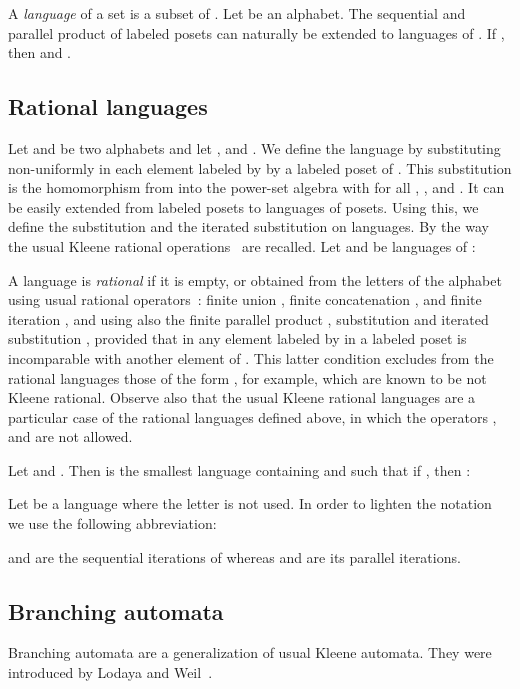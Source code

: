 \documentclass{CSML}
\begin{document}
A \emph{language} of a set  is a subset of .
Let  be an alphabet.
The sequential and parallel product of labeled posets can naturally be extended to languages of .
If , then  and .

\subsection{Rational languages}

Let  and  be two alphabets and let ,  and .
We define the language  by substituting non-uniformly in  each element labeled by  by a labeled poset of .
This substitution  is the homomorphism from  into the power-set algebra  with  for all , , and . 
It can be easily extended from labeled posets to languages of posets.
Using this, we define the substitution and the iterated substitution on languages. By the way the usual Kleene rational operations~\cite{Kle56} are recalled.
Let  and  be languages of :

A language  is
\emph{rational} if it is empty, or obtained from the letters of the alphabet~ using usual rational operators~: finite union ,
finite concatenation , and finite iteration , 
and using also the finite parallel product , substitution  and iterated substitution , provided that in  any element labeled by  in a labeled poset  is incomparable with another element of . This latter condition excludes from the rational languages those of the form , for example, which are known to be not Kleene rational. Observe also that the usual Kleene rational languages are a particular case of the rational languages defined above, in which the operators ,  and  are not allowed.

\begin{exa}
  \label{ex:abc}
  Let  and . Then  is the smallest language containing  and such that if , then :
  
\end{exa}

Let  be a language where the letter  is not used.
In order to lighten the notation we use the following abbreviation:

 and  are the sequential iterations of  whereas  and  are its parallel iterations.

\subsection{Branching automata}
\label{subsec:automata}

Branching automata are a generalization of usual Kleene automata.
They were introduced by Lodaya and Weil~\cite{lodaya98kleene,LW98:Algebra,LW00:sp}.
\end{document}
